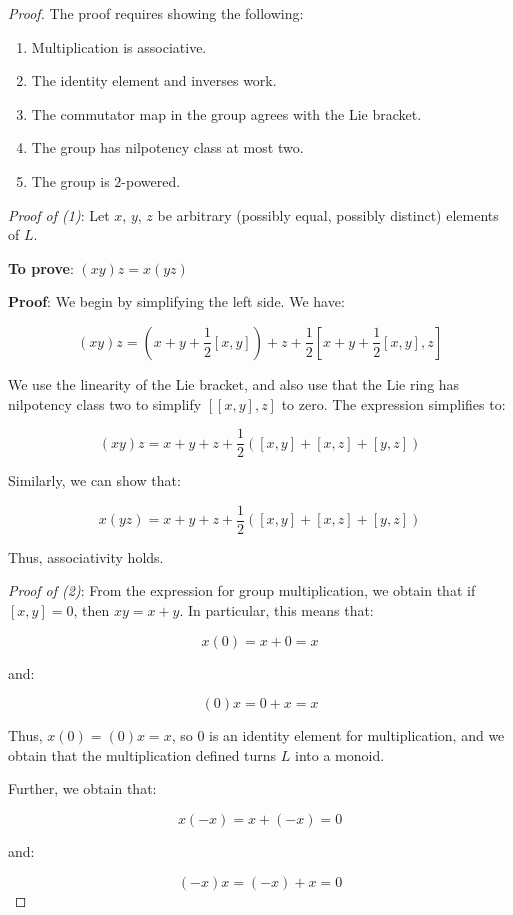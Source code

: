 \documentclass{ucetd}
\begin{document}
\begin{proof}
  The proof requires showing the following:

  \begin{enumerate}
  \item Multiplication is associative.
  \item The identity element and inverses work.
  \item The commutator map in the group agrees with the Lie bracket.
  \item The group has nilpotency class at most two.
  \item The group is $2$-powered.
  \end{enumerate}

  {\em Proof of (1)}: Let $x$, $y$, $z$ be arbitrary (possibly equal,
  possibly distinct) elements of $L$.

  {\bf To prove}: $(xy)z = x(yz)$

  {\bf Proof}: We begin by simplifying the left side. We have:

  $$(xy)z = \left(x + y + \frac{1}{2}[x,y]\right) + z + \frac{1}{2}\left[x + y + \frac{1}{2}[x,y],z\right]$$

  We use the linearity of the Lie bracket, and also use that the
  Lie ring has nilpotency class two to simplify $[[x,y],z]$
  to zero. The expression simplifies to:

  $$(xy)z = x + y + z + \frac{1}{2}\left([x,y] + [x,z] + [y,z]\right)$$

  Similarly, we can show that:

  $$x(yz) = x + y + z + \frac{1}{2}\left([x,y] + [x,z] + [y,z]\right)$$

  Thus, associativity holds.

  {\em Proof of (2)}: From the expression for group multiplication, we
  obtain that if $[x,y] = 0$, then $xy = x + y$. In particular, this
  means that:

  $$x(0) = x + 0 = x$$

  and:

  $$(0)x = 0 + x = x$$

  Thus, $x(0) = (0)x = x$, so $0$ is an identity element for
  multiplication, and we obtain that the multiplication defined turns
  $L$ into a monoid.

  Further, we obtain that:

  $$x(-x) = x + (-x) = 0$$

  and:

  $$(-x)x = (-x) + x = 0$$


\end{proof}
\end{document}
